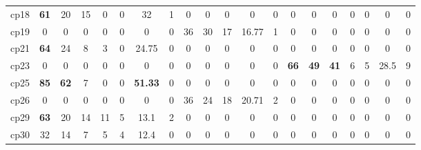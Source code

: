 \begin{tabular*}{\linewidth}{ @{\extracolsep{\fill}}c | ccccccc | ccccc | ccccccc @{}}
cp18 &  \textbf{{\color{red}61}} & 20  &  15  &  0  &  0 &  32  &  1 
     & 0 & 0  &  0  &  0  &  0   
    &  0 & 0  &  0  &  0  &  0 &  0  &  0  \\

cp19 &  0 & 0  &  0  &  0  &  0 &  0  &  0 
     & 36 & 30  &  17  &  16.77  &  1   
    &  0 & 0  &  0  &  0  &  0 &  0  &  0  \\

cp21 &  \textbf{{\color{red}64}} & 24  &  8  &  3  &  0 &  24.75  &  0 
    & 0 & 0  &  0  &  0  &  0   
    &  0 & 0  &  0  &  0  &  0 &  0  &  0  \\

cp23 &  0 & 0  &  0  &  0  &  0 &  0  &  0 
     & 0 & 0  &  0  &  0  &  0   
    &  \textbf{{\color{red}66}} & \textbf{{\color{red}49}}  &  \textbf{{\color{red}41}}  &  6  &  5 &  28.5  &  9  \\

cp25 &  \textbf{{\color{red}85}} & \textbf{{\color{red}62}}  &  7  &  0  &  0 &  \textbf{{\color{red}51.33}}  &  0 
    & 0 & 0  &  0  &  0  &  0   
   &  0 & 0  &  0  &  0  &  0 &  0  &  0  \\

cp26 &  0 & 0  &  0  &  0  &  0 &  0  &  0 
   & 36 & 24  &  18  &  20.71  &  2   
  &  0 & 0  &  0  &  0  &  0 &  0  &  0  \\

cp29 &  \textbf{{\color{red}63}} & 20  &  14  &  11  &  5 &  13.1  &  2 
    & 0 & 0  &  0  &  0  &  0  
    &  0 & 0  &  0  &  0  &  0 &  0  &  0  \\

cp30 &  32 & 14  &  7  &  5  &  4 &  12.4  &  0 
    & 0 & 0  &  0  &  0  &  0  
    &  0 & 0  &  0  &  0  &  0 &  0  &  0  \\
\bottomrule
\end{tabular*}
